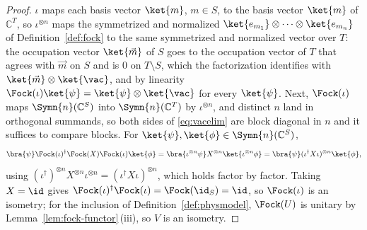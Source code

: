\begin{proof}
$\iota$ maps each basis vector $\ket{m}$, $m\in S$, to the basis vector
$\ket{m}$ of $\mathbb{C}^{T}$, so $\iota^{\otimes n}$ maps the symmetrized
and normalized $\ket{e_{m_1}}\otimes\cdots\otimes\ket{e_{m_n}}$ of
Definition~\ref{def:fock} to the same symmetrized and normalized vector over
$T$: the occupation vector $\ket{\vec m}$ of $S$ goes to the occupation
vector of $T$ that agrees with $\vec m$ on $S$ and is $0$ on $T\setminus S$,
which the factorization identifies with $\ket{\vec m}\otimes\ket{\vac}$, and
by linearity $\Fock(\iota)\ket{\psi}=\ket{\psi}\otimes\ket{\vac}$ for every
$\ket{\psi}$. Next, $\Fock(\iota)$ maps
$\Symn{n}(\mathbb{C}^{S})$ into $\Symn{n}(\mathbb{C}^{T})$ by
$\iota^{\otimes n}$, and distinct
$n$ land in orthogonal summands, so both sides of \eqref{eq:vacelim} are block
diagonal in $n$ and it suffices to compare blocks. For
$\ket{\psi},\ket{\phi}\in\Symn{n}(\mathbb{C}^{S})$,
\begin{equation}
  \bra{\psi}\Fock(\iota)^\dagger\Fock(X)\Fock(\iota)\ket{\phi}
  =\bra{\iota^{\otimes n}\psi}X^{\otimes n}\ket{\iota^{\otimes n}\phi}
  =\bra{\psi}(\iota^\dagger X\iota)^{\otimes n}\ket{\phi},
\end{equation}
using $(\iota^\dagger)^{\otimes n}X^{\otimes n}\iota^{\otimes n}
=(\iota^\dagger X\iota)^{\otimes n}$, which holds factor by factor. Taking
$X=\id$ gives $\Fock(\iota)^\dagger\Fock(\iota)=\Fock(\id_{S})=\id$, so
$\Fock(\iota)$ is an isometry; for the inclusion of
Definition~\ref{def:physmodel}, $\Fock(U)$ is unitary by
Lemma~\ref{lem:fock-functor}\,(iii), so $V$ is an isometry.
\end{proof}
